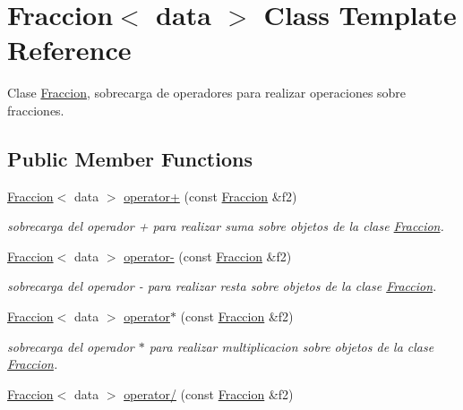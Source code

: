 \hypertarget{classFraccion}{\section{Fraccion$<$ data $>$ Class Template Reference}
\label{classFraccion}
}


Clase \hyperlink{classFraccion}{Fraccion}, sobrecarga de operadores para realizar operaciones sobre fracciones.  


\subsection*{Public Member Functions}
\begin{DoxyCompactItemize}
\item 
\hypertarget{classFraccion_ada0df61d5f6162c8a523b35e302877f2}{\hyperlink{classFraccion}{Fraccion}$<$ data $>$ \hyperlink{classFraccion_ada0df61d5f6162c8a523b35e302877f2}{operator+} (const \hyperlink{classFraccion}{Fraccion} \&f2)}\label{classFraccion_ada0df61d5f6162c8a523b35e302877f2}

\begin{DoxyCompactList}\small\item\em sobrecarga del operador + para realizar suma sobre objetos de la clase \hyperlink{classFraccion}{Fraccion}. \end{DoxyCompactList}\item 
\hypertarget{classFraccion_ade52a3676c602ababfebc306dac9e517}{\hyperlink{classFraccion}{Fraccion}$<$ data $>$ \hyperlink{classFraccion_ade52a3676c602ababfebc306dac9e517}{operator-\/} (const \hyperlink{classFraccion}{Fraccion} \&f2)}\label{classFraccion_ade52a3676c602ababfebc306dac9e517}

\begin{DoxyCompactList}\small\item\em sobrecarga del operador -\/ para realizar resta sobre objetos de la clase \hyperlink{classFraccion}{Fraccion}. \end{DoxyCompactList}\item 
\hypertarget{classFraccion_ad5a4dbda00396871cf2a507340d25ef9}{\hyperlink{classFraccion}{Fraccion}$<$ data $>$ \hyperlink{classFraccion_ad5a4dbda00396871cf2a507340d25ef9}{operator$\ast$} (const \hyperlink{classFraccion}{Fraccion} \&f2)}\label{classFraccion_ad5a4dbda00396871cf2a507340d25ef9}

\begin{DoxyCompactList}\small\item\em sobrecarga del operador $\ast$ para realizar multiplicacion sobre objetos de la clase \hyperlink{classFraccion}{Fraccion}. \end{DoxyCompactList}\item 
\hypertarget{classFraccion_a86f96972e2b74b5185c79a0cb90557ba}{\hyperlink{classFraccion}{Fraccion}$<$ data $>$ \hyperlink{classFraccion_a86f96972e2b74b5185c79a0cb90557ba}{operator/} (const \hyperlink{classFraccion}{Fraccion} \&f2)}\label{classFraccion_a86f96972e2b74b5185c79a0cb90557ba}


\end{DoxyCompactItemize}
